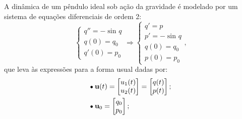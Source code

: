 \documentclass[../differential_methods.tex]{subfiles}
\begin{document}
\begin{example}[Pêndulo]
	A dinâmica de um pêndulo ideal sob ação da gravidade é modelado por um sistema de equações diferenciais de ordem 2:
	\[
		\left\{\begin{array}{ll}
			q''=-\sin^{}{q} \\
			q(0)=q_{0}      \\
			q'(0)=p_{0}
		\end{array}\right. \Rightarrow \left\{\begin{array}{ll}
			q'=p           \\
			p'=-\sin^{}{q} \\
			q(0)=q_{0}     \\
			p(0)=p_{0}
		\end{array}\right.,
	\]
	que leva às expressões para a forma usual dadas por:
	\begin{align*}
		 & \tikz[baseline=-0.5ex]\draw[black, fill=black, radius=1.5pt](0, 0)circle;\; \mathbf{u}(t)=\begin{bmatrix}
			                                                                                             u_1(t) \\
			                                                                                             u_2(t)
		                                                                                             \end{bmatrix} = \begin{bmatrix}
			                                                                                                             q(t) \\
			                                                                                                             p(t)
		                                                                                                             \end{bmatrix};                             \\
		 & \tikz[baseline=-0.5ex]\draw[black, fill=black, radius=1.5pt](0, 0)circle;\; \mathbf{u}_{0}= \begin{bmatrix}
			                                                                                               q_{0} \\
			                                                                                               p_{0}
		                                                                                               \end{bmatrix};                                           \\

\end{align*}
\end{example}
\end{document}
